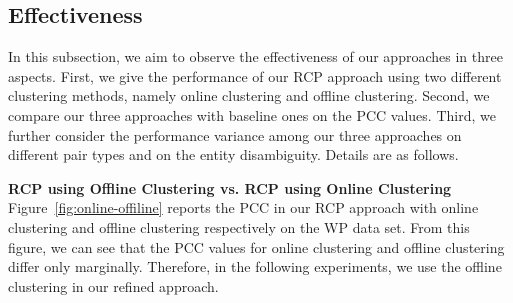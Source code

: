 
\subsection{Effectiveness}
In this subsection, we aim to observe the effectiveness of our approaches in three aspects. First, we give the performance of our RCP approach using two different clustering methods, namely online clustering and offline clustering. Second, we compare our three approaches with baseline ones on the PCC values. Third, we further consider the performance variance among our three approaches on different pair types and on the entity disambiguity. Details are as follows.

\noindent\textbf{RCP using Offline Clustering vs. RCP using Online Clustering}~
Figure~\ref{fig:online-offiline} reports the PCC in our RCP
approach with online clustering and offline
clustering respectively on the WP data set.
From this figure, we can see that the PCC values for
online clustering and offline clustering differ only marginally.
Therefore, in the following experiments,
we use the offline clustering in our refined approach.

